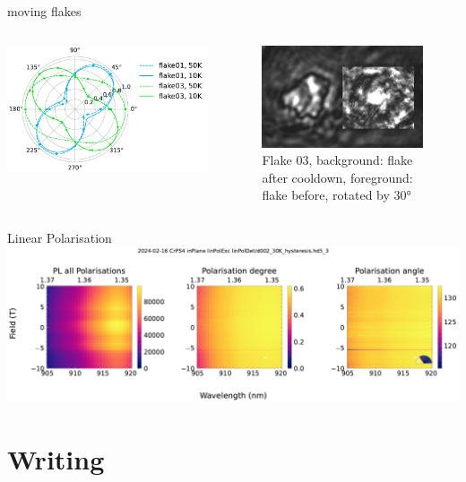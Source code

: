 \begin{frame}{moving flakes}
	\begin{columns}

		\centering
		\includegraphics{../figures/2023-12-14 flake turning linear polarisation.pdf}


		\centering
		\begin{figure}
			\includegraphics[width=\textwidth]{../../data/2023-12-14_CrPS4_outPlane/flake03_rotation_cropped.png}
			\caption{Flake 03, background: flake after cooldown, foreground: flake before, rotated by 30°}
		\end{figure}
	\end{columns}

\end{frame}

\begin{frame}{Linear Polarisation}
	\centering
	\includegraphics{../figures/2023-12-15 CrPS4 linear dichroism.pdf}
\end{frame}


\section{Writing}
\sectionframe

